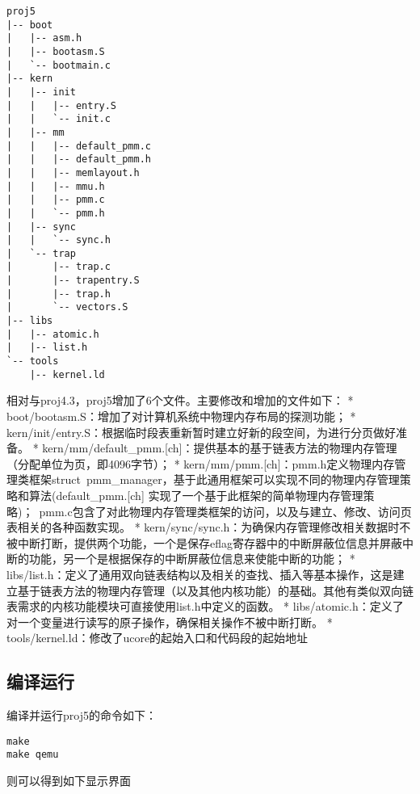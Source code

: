 \begin{lstlisting}
proj5
|-- boot
|   |-- asm.h
|   |-- bootasm.S
|   `-- bootmain.c
|-- kern
|   |-- init
|   |   |-- entry.S
|   |   `-- init.c
|   |-- mm
|   |   |-- default_pmm.c
|   |   |-- default_pmm.h
|   |   |-- memlayout.h
|   |   |-- mmu.h
|   |   |-- pmm.c
|   |   `-- pmm.h
|   |-- sync
|   |   `-- sync.h
|   `-- trap
|       |-- trap.c
|       |-- trapentry.S
|       |-- trap.h
|       `-- vectors.S
|-- libs
|   |-- atomic.h
|   |-- list.h
`-- tools
    |-- kernel.ld
\end{lstlisting}

相对与proj4.3，proj5增加了6个文件。主要修改和增加的文件如下： *
boot/bootasm.S：增加了对计算机系统中物理内存布局的探测功能； *
kern/init/entry.S：根据临时段表重新暂时建立好新的段空间，为进行分页做好准备。
*
kern/mm/default\_pmm.{[}ch{]}：提供基本的基于链表方法的物理内存管理（分配单位为页，即4096字节）；
*
kern/mm/pmm.{[}ch{]}：pmm.h定义物理内存管理类框架struct~pmm\_manager，基于此通用框架可以实现不同的物理内存管理策略和算法(default\_pmm.{[}ch{]}
实现了一个基于此框架的简单物理内存管理策略)；~pmm.c包含了对此物理内存管理类框架的访问，以及与建立、修改、访问页表相关的各种函数实现。
*
kern/sync/sync.h：为确保内存管理修改相关数据时不被中断打断，提供两个功能，一个是保存eflag寄存器中的中断屏蔽位信息并屏蔽中断的功能，另一个是根据保存的中断屏蔽位信息来使能中断的功能；
*
libs/list.h：定义了通用双向链表结构以及相关的查找、插入等基本操作，这是建立基于链表方法的物理内存管理（以及其他内核功能）的基础。其他有类似双向链表需求的内核功能模块可直接使用list.h中定义的函数。
*
libs/atomic.h：定义了对一个变量进行读写的原子操作，确保相关操作不被中断打断。
* tools/kernel.ld：修改了ucore的起始入口和代码段的起始地址

\subsection{编译运行}\label{ux7f16ux8bd1ux8fd0ux884c}

编译并运行proj5的命令如下：

\begin{lstlisting}
make
make qemu
\end{lstlisting}

则可以得到如下显示界面

